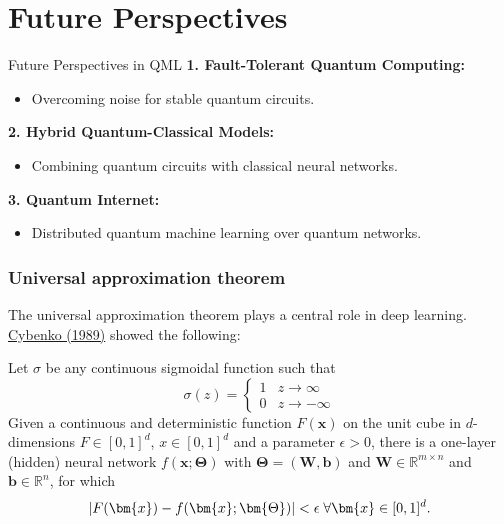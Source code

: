 \documentclass{beamer}
\begin{document}
\section{Future Perspectives}
\begin{frame}{Future Perspectives in QML}
\textbf{1. Fault-Tolerant Quantum Computing:}
\begin{itemize}
    \item Overcoming noise for stable quantum circuits.
\end{itemize}

\textbf{2. Hybrid Quantum-Classical Models:}
\begin{itemize}
    \item Combining quantum circuits with classical neural networks.
\end{itemize}

\textbf{3. Quantum Internet:}
\begin{itemize}
    \item Distributed quantum machine learning over quantum networks.
\end{itemize}
\end{frame}
















\begin{frame}
\frametitle{Universal approximation theorem}

The universal approximation theorem plays a central role in deep
learning.  \href{{https://link.springer.com/article/10.1007/BF02551274}}{Cybenko (1989)} showed
the following:

\begin{block}{}
Let $\sigma$ be any continuous sigmoidal function such that
\[
\sigma(z) = \left\{\begin{array}{cc} 1 & z\rightarrow \infty\\ 0 & z \rightarrow -\infty \end{array}\right.
\]
Given a continuous and deterministic function $F(\bm{x})$ on the unit
cube in $d$-dimensions $F\in [0,1]^d$, $x\in [0,1]^d$ and a parameter
$\epsilon >0$, there is a one-layer (hidden) neural network
$f(\bm{x};\bm{\Theta})$ with $\bm{\Theta}=(\bm{W},\bm{b})$ and $\bm{W}\in
\mathbb{R}^{m\times n}$ and $\bm{b}\in \mathbb{R}^{n}$, for which
\[
\vert F(\bm{x})-f(\bm{x};\bm{\Theta})\vert < \epsilon \hspace{0.1cm} \forall \bm{x}\in[0,1]^d.
\]

\end{block}
\end{frame}
\end{document}

